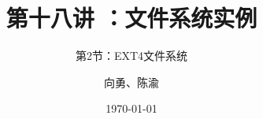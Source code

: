 


\title[第18讲]{第十八讲 ：文件系统实例} %
\subtitle{第2节：EXT4文件系统}
\author{向勇、陈渝} %
\date{\today} %



\begin{frame}
\titlepage %
\end{frame}

